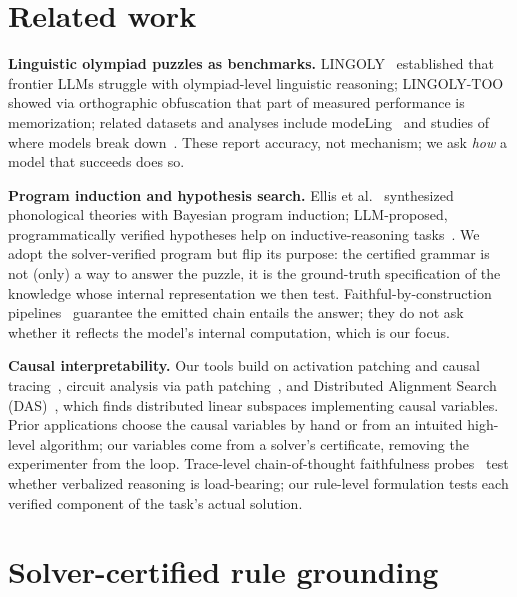 \documentclass{article}
\begin{document}
\section{Related work}
\label{sec:related}

\textbf{Linguistic olympiad puzzles as benchmarks.}
LINGOLY~\citep{lingoly} established that frontier LLMs struggle with
olympiad-level linguistic reasoning; LINGOLY-TOO~\citep{lingolytoo} showed via
orthographic obfuscation that part of measured performance is memorization;
related datasets and analyses include modeLing~\citep{modeling} and studies of
where models break down~\citep{unveiling,llmsolvegen}. These report accuracy,
not mechanism; we ask \emph{how} a model that succeeds does so.

\textbf{Program induction and hypothesis search.}
Ellis et al.~\citep{ellis2022} synthesized phonological theories with Bayesian
program induction; LLM-proposed, programmatically verified hypotheses help on
inductive-reasoning tasks~\citep{wang2023hypothesis}. We adopt the
solver-verified program but flip its purpose: the certified grammar is not
(only) a way to answer the puzzle, it is the ground-truth specification of the
knowledge whose internal representation we then test.
Faithful-by-construction pipelines~\citep{lyu2023,logiclm} guarantee the
emitted chain entails the answer; they do not ask whether it reflects the
model's internal computation, which is our focus.

\textbf{Causal interpretability.}
Our tools build on activation patching and causal
tracing~\citep{meng2022rome}, circuit analysis via path
patching~\citep{wang2022ioi,goldowskydill2023}, and Distributed Alignment
Search (DAS)~\citep{geiger2023das,wu2023boundless}, which finds distributed
linear subspaces implementing causal variables. Prior applications choose the
causal variables by hand or from an intuited high-level algorithm; our
variables come from a solver's certificate, removing the experimenter from the
loop. Trace-level chain-of-thought faithfulness
probes~\citep{lanham2023,turpin2023} test whether verbalized reasoning is
load-bearing; our rule-level formulation tests each verified component of the
task's actual solution.

\section{Solver-certified rule grounding}
\label{sec:grounding}
\end{document}
